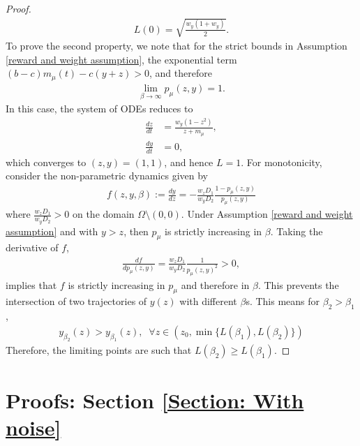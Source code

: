 \documentclass[10pt]{article}
\begin{document}
\begin{proof}
\begin{align*}
        L(0) = \sqrt{\frac{w_y(1+w_y)}{2}}.
    \end{align*}
    To prove the second property, we note that for the strict bounds in Assumption \ref{reward and weight assumption}, the exponential term $(b-c)m_\mu(t)-c(y+z) >0$, and therefore 
    \begin{align*}
        \lim_{\beta \rightarrow\infty} p_\mu(z,y) = 1.
    \end{align*}
    In this case, the system of ODEs reduces to 
    \begin{align*}
            \frac{dz}{dt} &= \frac{w_y(1 - z^2)}{z+m_\mu},\\
            \frac{dy}{dt} &= 0,
    \end{align*}
    which converges to $(z,y) = (1,1)$, and hence $L=1$. For monotonicity, consider the non-parametric dynamics given by
    \begin{align*}
        f(z,y,\beta):=\frac{dy}{dz} = -\frac{w_zD_1}{w_yD_2} \frac{1-p_\mu(z,y)}{p_\mu(z,y)}
    \end{align*}
    where $\frac{w_zD_1}{w_yD_2} >0$ on the domain $\Omega\setminus(0,0)$. Under Assumption \ref{reward and weight assumption} and with $y >z$, then $p_\mu$ is strictly increasing in $\beta$. Taking the derivative of $f$,
    \begin{align*}
        \frac{df}{dp_\mu(z,y)}  = \frac{w_zD_1}{w_yD_2} \frac{1}{p_\mu(z,y)^2} > 0, 
    \end{align*}
    implies that $f$ is strictly increasing in $p_\mu$ and therefore in $\beta$. This prevents the intersection of two trajectories of $y(z)$ with different $\beta$s. This means for $\beta_2 > \beta_1$,
    \begin{align*}
        y_{\beta_2}(z) > y_{\beta_1}(z),\;\; \forall z \in (z_0, \min\{L(\beta_1),L(\beta_2)\})
    \end{align*}
    Therefore, the limiting points are such that $L(\beta_2) \geq L(\beta_1)$.
\end{proof}




\section{Proofs: Section \ref{Section: With noise}} \label{Appendix: With noise}
\end{document}
